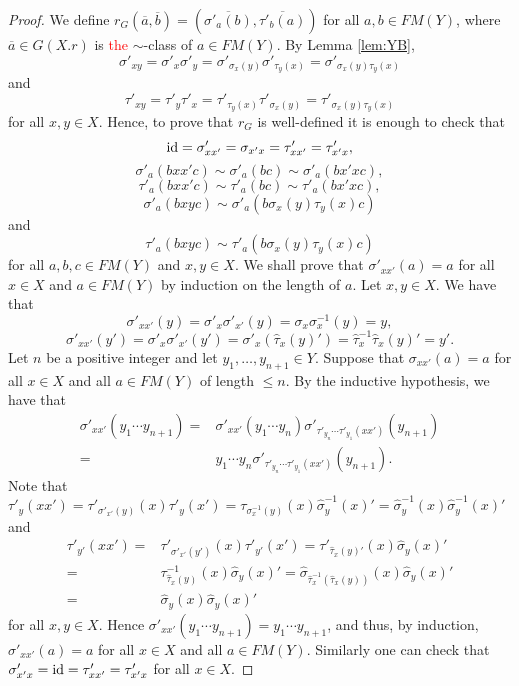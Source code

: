 \begin{proof}
We define $r_G(\overline{a},\overline{b})=(\overline{\sigma'_a(b)},\overline{\tau'_b(a)})$ for all $a,b\in FM(Y)$, where $\overline{a}\in G(X.r)$ is \textcolor{red}{the} $\sim$-class of $a\in FM(Y)$. By Lemma \ref{lem:YB}, \[\sigma'_{xy}=\sigma'_{x}\sigma'_{y}=\sigma'_{\sigma_x(y)}\sigma'_{\tau_y(x)}=\sigma'_{\sigma_x(y)\tau_y(x)}\]
and
\[\tau'_{xy}=\tau'_{y}\tau'_{x}=\tau'_{\tau_y(x)}\tau'_{\sigma_x(y)}=\tau'_{\sigma_x(y)\tau_y(x)}\]
for all $x,y\in X$. Hence, to prove that $r_G$ is well-defined it is enough to check that \[\operatorname{id}=\sigma'_{xx'}=\sigma_{x'x}=\tau'_{xx'}=\tau'_{x'x},\] 
\[ \sigma'_{a}(bxx'c)\sim\sigma'_{a}(bc)\sim \sigma'_a(bx'xc),\]
\[ \tau'_{a}(bxx'c)\sim\tau'_{a}(bc)\sim \tau'_a(bx'xc),\]
\[\sigma'_{a}(bxyc)\sim \sigma'_a(b\sigma_x(y)\tau_y(x)c)\]
and 
\[\tau'_{a}(bxyc)\sim \tau'_a(b\sigma_x(y)\tau_y(x)c)\]
for all $a,b,c\in FM(Y)$ and $x,y\in X$.
We shall prove that $\sigma'_{xx'}(a)=a$ for all $x\in X$ and $a\in FM(Y)$ by induction on the length of $a$. Let $x,y\in X$. We have that
\[\sigma'_{xx'}(y)=\sigma'_x\sigma'_{x'}(y)=\sigma_x\sigma^{-1}_x(y)=y,\]
\[\sigma'_{xx'}(y')=\sigma'_x\sigma'_{x'}(y')=\sigma'_x(\widehat{\tau}_x(y)')=\widehat{\tau}^{-1}_x\widehat{\tau}_x(y)'=y'.\]
Let $n$ be a positive integer and let $y_1,\dots ,y_{n+1}\in Y$. Suppose that $\sigma_{xx'}(a)=a$ for all $x\in X$ and all $a\in FM(Y)$ of length $\leq n$. By the inductive hypothesis, we have that
\begin{align*}
    \sigma'_{xx'}(y_1\cdots y_{n+1})=&\sigma'_{xx'}(y_1\cdots y_n)\sigma'_{\tau'_{y_n}\cdots \tau'_{y_1}(xx')}(y_{n+1})\\
    =&y_1\cdots y_n\sigma'_{\tau'_{y_n}\cdots \tau'_{y_1}(xx')}(y_{n+1}).
\end{align*}
Note that $\tau'_{y}(xx')=\tau'_{\sigma'_{x'}(y)}(x)\tau'_y(x')=\tau_{\sigma^{-1}_x(y)}(x)\widehat{\sigma}_y^{-1}(x)'=\widehat{\sigma}_y^{-1}(x)\widehat{\sigma}_y^{-1}(x)'$ and
\begin{align*}\tau'_{y'}(xx')=&\tau'_{\sigma'_{x'}(y')}(x)\tau'_{y'}(x')
=\tau'_{\widehat{\tau}_x(y)'}(x)\widehat{\sigma}_y(x)'\\
=&\tau^{-1}_{\widehat{\tau}_x(y)}(x)\widehat{\sigma}_y(x)'=\widehat{\sigma}_{\widehat{\tau}^{-1}_x(\widehat{\tau}_x(y))}(x)\widehat{\sigma}_y(x)'\\
=&\widehat{\sigma}_y(x)\widehat{\sigma}_y(x)'
\end{align*} 
for all $x,y\in X$. Hence $\sigma'_{xx'}(y_1\cdots y_{n+1})=y_1\cdots y_{n+1}$, and thus, by induction, $\sigma'_{xx'}(a)=a$ for all $x\in X$ and all $a\in FM(Y)$. 
Similarly one can check that $\sigma'_{x'x}=\operatorname{id}=\tau'_{xx'}=\tau'_{x'x}$ for all $x\in X$. 


\end{proof}
